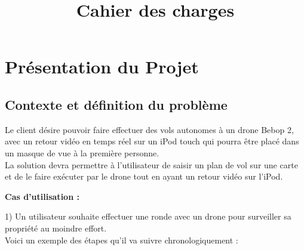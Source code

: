 \documentclass{article}
\title{Cahier des charges}
\begin{document}
\sectionfont{\underline}

\maketitle
\section{Présentation du Projet}
	\subsection{Contexte et définition du problème}
		Le client désire pouvoir faire effectuer des vols autonomes à un drone Bebop 2, avec un retour vidéo en temps réel sur un iPod touch qui pourra être placé dans un masque de vue à la première personne.\\
		La solution devra permettre à l'utilisateur de saisir un plan de vol sur une carte et de le faire exécuter par le drone tout en ayant un retour vidéo sur l'iPod.\\
		\medbreak
        \begin{flushleft}
	        \textbf{Cas d'utilisation :} \\
	    \end{flushleft}
	    \begin{flushleft}
	    1) Un utilisateur souhaite effectuer une ronde avec un drone pour surveiller sa propriété au moindre effort.\\
	    Voici un exemple des étapes qu'il va suivre chronologiquement :\\
	     \end{flushleft}
\end{document}
